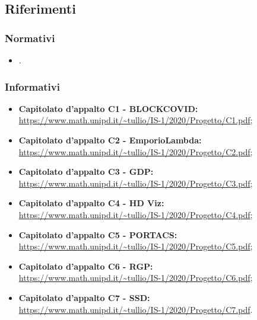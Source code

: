 \subsection{Riferimenti}
\subsubsection{Normativi}
\begin{itemize}
\item {}.
\end{itemize}
\subsubsection{Informativi}
\begin{itemize}
\item \textbf {Capitolato d'appalto C1 - BLOCKCOVID:}\\
\url{https://www.math.unipd.it/~tullio/IS-1/2020/Progetto/C1.pdf};
\item \textbf {Capitolato d'appalto C2 - EmporioLambda:}\\
\url{https://www.math.unipd.it/~tullio/IS-1/2020/Progetto/C2.pdf};
\item \textbf {Capitolato d'appalto C3 - GDP:}\\
\url{https://www.math.unipd.it/~tullio/IS-1/2020/Progetto/C3.pdf};
\item \textbf {Capitolato d'appalto C4 - HD Viz:}\\
\url{https://www.math.unipd.it/~tullio/IS-1/2020/Progetto/C4.pdf};
\item \textbf {Capitolato d'appalto C5 - PORTACS:}\\
\url{https://www.math.unipd.it/~tullio/IS-1/2020/Progetto/C5.pdf};
\item \textbf {Capitolato d'appalto C6 - RGP:}\\
\url{https://www.math.unipd.it/~tullio/IS-1/2020/Progetto/C6.pdf};
\item \textbf {Capitolato d'appalto C7 - SSD:}\\
\url{https://www.math.unipd.it/~tullio/IS-1/2020/Progetto/C7.pdf}.
\end{itemize}